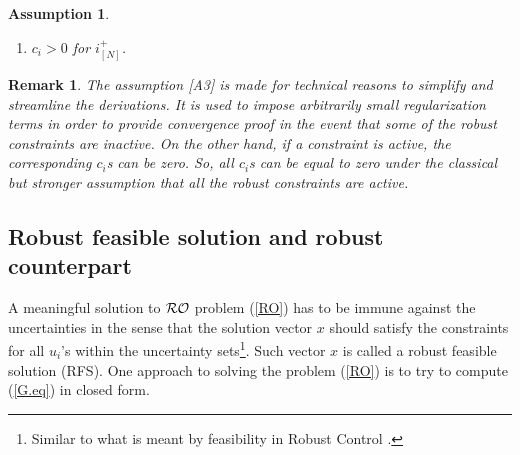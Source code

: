 \documentclass[journal,twoside,web]{ieeecolor}
\newtheorem{assumption}[theorem]{Assumption}
\newtheorem{remark}{Remark}
\begin{document}
\begin{assumption} \label{assume_c>0} 
\begin{enumerate}
\item [A3] $c_i > 0$ for $i^+_{[N]}$.
\end{enumerate}
\end{assumption}


\begin{remark} \label{active_inactive_constraint_rem}
The assumption [A3] is made for technical reasons to simplify and streamline the derivations. It is used to impose arbitrarily small regularization terms in order to provide convergence proof in the event that some of the robust constraints are inactive. On the other hand, if a constraint is active, the corresponding $c_i$s can be zero. So, all $c_i$s can be equal to zero under the classical but stronger assumption that all the robust constraints are active.  %
\end{remark}
 
\subsection{Robust feasible solution and robust counterpart}
A meaningful solution to ${\cal RO}$ problem (\ref{RO}) has to be immune against the uncertainties in the sense that the solution vector $x$ should satisfy the constraints for all $u_i$'s within the uncertainty sets\footnote{Similar to what is meant by feasibility in Robust Control \cite{zhou1995}.}. Such vector $x$ is called a robust feasible solution (RFS). One approach to solving the problem (\ref{RO}) is to try to compute (\ref{G.eq}) in closed form. 
\end{document}
